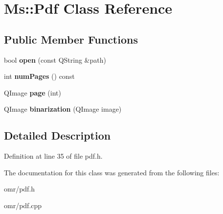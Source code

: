 \hypertarget{class_ms_1_1_pdf}{}\section{Ms\+:\+:Pdf Class Reference}
\label{class_ms_1_1_pdf}
\subsection*{Public Member Functions}
\begin{DoxyCompactItemize}
\item 
\mbox{\label{class_ms_1_1_pdf_a54b60a5cf7ea4d0bc74712b60dadc328}} 
bool {\bfseries open} (const Q\+String \&path)
\item 
\mbox{\label{class_ms_1_1_pdf_aac0f07c88bd5a0a905174e762c23fc59}} 
int {\bfseries num\+Pages} () const
\item 
\mbox{\label{class_ms_1_1_pdf_ab85f6ebfeccb468ef87a51b48f7f5e46}} 
Q\+Image {\bfseries page} (int)
\item 
\mbox{\label{class_ms_1_1_pdf_add0d407471fd8f83d15a3083ddef92f9}} 
Q\+Image {\bfseries binarization} (Q\+Image image)
\end{DoxyCompactItemize}


\subsection{Detailed Description}


Definition at line 35 of file pdf.\+h.



The documentation for this class was generated from the following files\+:\begin{DoxyCompactItemize}
\item 
omr/pdf.\+h\item 
omr/pdf.\+cpp\end{DoxyCompactItemize}
